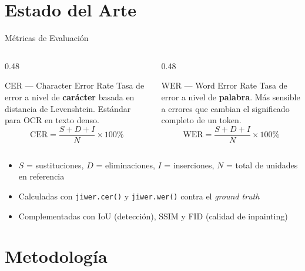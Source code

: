 \documentclass[aspectratio=169, 11pt]{beamer}
\newcommand{\lib}[1]{\texttt{\small\color{AccBlue}#1}}
\begin{document}
\section{Estado del Arte}

\begin{frame}{Métricas de Evaluación}
  \begin{columns}[T]
    \begin{column}{0.48\textwidth}
      \begin{block}{CER — Character Error Rate}
        Tasa de error a nivel de \textbf{carácter} basada en distancia de Levenshtein. Estándar para OCR en texto denso.
        $$\text{CER} = \frac{S + D + I}{N} \times 100\%$$
      \end{block}
    \end{column}
    \begin{column}{0.48\textwidth}
      \begin{block}{WER — Word Error Rate}
        Tasa de error a nivel de \textbf{palabra}. Más sensible a errores que cambian el significado completo de un token.
        $$\text{WER} = \frac{S + D + I}{N} \times 100\%$$
      \end{block}
    \end{column}
  \end{columns}
  \vspace{10pt}
  \begin{itemize}
    \item $S$ = sustituciones, $D$ = eliminaciones, $I$ = inserciones, $N$ = total de unidades en referencia
    \item Calculadas con \lib{jiwer.cer()} y \lib{jiwer.wer()} contra el \textit{ground truth}
    \item Complementadas con IoU (detección), SSIM y FID (calidad de inpainting)
  \end{itemize}
\end{frame}

\section{Metodología}
\end{document}
